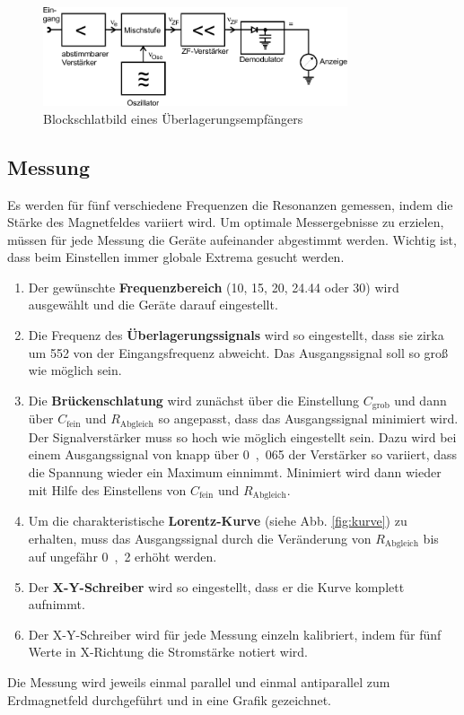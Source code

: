 \begin{figure}[h!]
	\centering
	\includegraphics[width=0.8\textwidth]{Anleitung_Abb9.pdf}
	\caption[Blockschlatbild eines Überlagerungsempfängers]{Blockschlatbild eines Überlagerungsempfängers \cite{V28}}
	\label{fig:verstaerker}
\end{figure}




\clearpage

\subsection{Messung}
Es werden für fünf verschiedene Frequenzen die Resonanzen gemessen, indem die Stärke des Magnetfeldes variiert wird. Um optimale Messergebnisse zu erzielen, müssen für jede Messung die Geräte aufeinander abgestimmt werden. Wichtig ist, dass beim Einstellen immer globale Extrema gesucht werden.

\begin{enumerate}
	
\item{Der gewünschte \textbf{Frequenzbereich} (10, 15, 20, 24.44 oder \si{30}{\mega\hertz}) wird ausgewählt und die Geräte darauf eingestellt.}

\item{Die Frequenz des \textbf{Überlagerungssignals} wird so eingestellt, dass sie zirka um \si{552}{\kilo\hertz} von der Eingangsfrequenz abweicht. Das Ausgangssignal soll so groß wie möglich sein.}

\item{Die \textbf{Brückenschlatung} wird zunächst über die Einstellung $C_\textrm{grob}$ und dann über $C_\textrm{fein}$ und $R_\textrm{Abgleich}$ so angepasst, dass das Ausgangssignal minimiert wird. Der Signalverstärker muss so hoch wie möglich eingestellt sein. Dazu wird bei einem  Ausgangssignal von knapp über \si{0,065}{\volt} der Verstärker so variiert, dass die Spannung wieder ein Maximum einnimmt. Minimiert wird dann wieder mit Hilfe des Einstellens von $C_\textrm{fein}$ und $R_{\textrm{Abgleich}}$.}

\item{Um die charakteristische \textbf{Lorentz-Kurve} (siehe Abb. \ref{fig:kurve}) zu erhalten, muss das Ausgangssignal durch die Veränderung von $R_\textrm{Abgleich}$ bis auf ungefähr  \si{0,2}{\volt} erhöht werden.}

\item{Der \textbf{X-Y-Schreiber} wird so eingestellt, dass er die Kurve komplett aufnimmt.}
\item{Der X-Y-Schreiber wird für jede Messung einzeln kalibriert, indem für fünf Werte in X-Richtung die Stromstärke notiert wird.\label{Schritt6}}
\end{enumerate}
Die Messung wird jeweils einmal parallel und einmal antiparallel zum Erdmagnetfeld durchgeführt und in eine Grafik gezeichnet.

